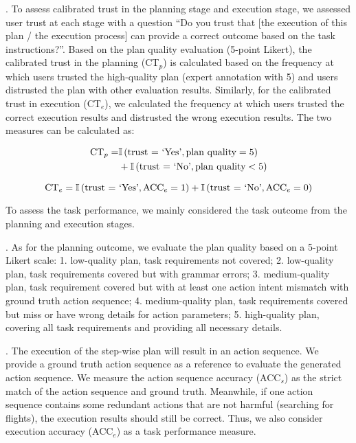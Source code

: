 . To assess calibrated trust in the planning stage and execution stage, we assessed user trust at each stage with a question ``Do you trust that [the execution of this plan / the execution process] can provide a correct outcome based on the task instructions?''. 
Based on the plan quality evaluation (5-point Likert), the calibrated trust in the planning (CT$_p$) is calculated based on the frequency at which users trusted the high-quality plan (expert annotation with 5) and users distrusted the plan with other evaluation results.
Similarly, for the calibrated trust in execution (CT$_e$), we calculated the frequency at which users trusted the correct execution results and distrusted the wrong execution results. 
The two measures can be calculated as:

\begin{equation}
\begin{aligned}
    \textnormal{CT}_p = &\mathbb{I}\left( \textnormal{trust = `Yes'}, \textnormal{plan quality} = 5\right) \\ & +\mathbb{I}\left( \textnormal{trust = `No'}, \textnormal{plan quality} < 5\right)
\end{aligned}
\end{equation}

\begin{equation}
    \textnormal{CT}_e = \mathbb{I}\left( \textnormal{trust = `Yes'}, \textnormal{ACC}_e = 1\right) + \mathbb{I}\left( \textnormal{trust = `No'}, \textnormal{ACC}_e = 0 \right)
\end{equation}

To assess the task performance, we mainly considered the task outcome from the planning and execution stages. 

. As for the planning outcome, we evaluate the plan quality based on a 5-point Likert scale: 
1. low-quality plan, task requirements not covered; 
2. low-quality plan, task requirements covered but with grammar errors; 
3. medium-quality plan, task requirement covered but with at least one action intent mismatch with ground truth action sequence; 
4. medium-quality plan, task requirements covered but miss or have wrong details for action parameters; 
5. high-quality plan, covering all task requirements and providing all necessary details.

. 
The execution of the step-wise plan will result in an action sequence. 
We provide a ground truth action sequence as a reference to evaluate the generated action sequence. 
We measure the action sequence accuracy (ACC$_s$) as the strict match of the action sequence and ground truth. 
Meanwhile, if one action sequence contains some redundant actions that are not harmful (\eg searching for flights), the execution results should still be correct. 
Thus, we also consider execution accuracy (ACC$_e$) as a task performance measure.

